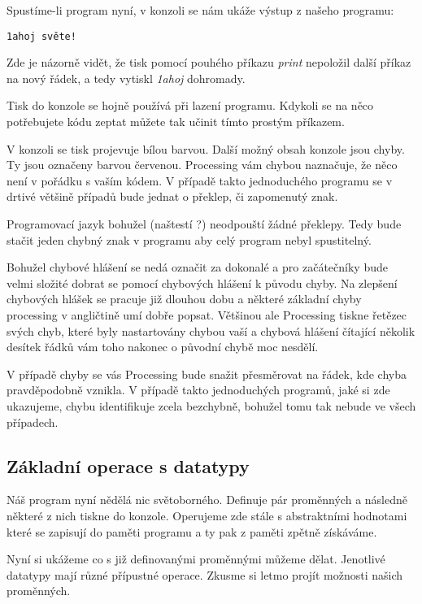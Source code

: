 \documentclass[11pt]{article}
\begin{document}
Spustíme-li program nyní, v konzoli se nám ukáže výstup z našeho programu:

\begin{lstlisting}
1ahoj světe!
\end{lstlisting}

Zde je názorně vidět, že tisk pomocí pouhého příkazu {\em print} nepoložil další příkaz na nový řádek, a tedy vytiskl {\em 1ahoj} dohromady.

Tisk do konzole se hojně používá při lazení programu. Kdykoli se na něco potřebujete kódu zeptat můžete tak učinit tímto prostým příkazem.

V konzoli se tisk projevuje bílou barvou. Další možný obsah konzole jsou chyby. Ty jsou označeny barvou červenou. Processing vám chybou naznačuje, že něco není v pořádku s vaším kódem. V případě takto jednoduchého programu se v drtivé většině případů bude jednat o překlep, či zapomenutý znak.

Programovací jazyk bohužel (naštestí ?) neodpouští žádné překlepy. Tedy bude stačit jeden chybný znak v programu aby celý program nebyl spustitelný.

Bohužel chybové hlášení se nedá označit za dokonalé a pro začátečníky bude velmi složité dobrat se pomocí chybových hlášení k původu chyby. Na zlepšení chybových hlášek se pracuje již dlouhou dobu a některé základní chyby processing v angličtině umí dobře popsat. Většinou ale Processing tiskne řetězec svých chyb, které byly nastartovány chybou vaší a chybová hlášení čítající několik desítek řádků vám toho nakonec o původní chybě moc nesdělí.

V případě chyby se vás Processing bude snažit přesměrovat na řádek, kde chyba pravděpodobně vznikla. V případě takto jednoduchých programů, jaké si zde ukazujeme, chybu identifikuje zcela bezchybně, bohužel tomu tak nebude ve všech případech.


\subsection{Základní operace s datatypy}

Náš program nyní nědělá nic světoborného. Definuje pár proměnných a následně některé z nich tiskne do konzole. Operujeme zde stále s abstraktními hodnotami které se zapisují do paměti programu a ty pak z paměti zpětně získáváme.

Nyní si ukážeme co s již definovanými proměnnými můžeme dělat. Jenotlivé datatypy mají různé přípustné operace. Zkusme si letmo projít možnosti našich proměnných.
\end{document}
